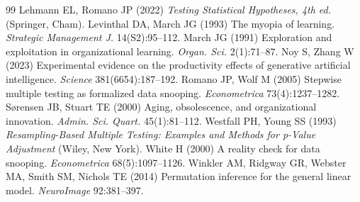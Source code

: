 \begin{thebibliography}{99}
 Lehmann EL, Romano JP (2022) \textit{Testing Statistical Hypotheses, 4th ed.} (Springer, Cham).
 Levinthal DA, March JG (1993) The myopia of learning. \textit{Strategic Management J.} 14(S2):95--112.
 March JG (1991) Exploration and exploitation in organizational learning. \textit{Organ. Sci.} 2(1):71--87.
 Noy S, Zhang W (2023) Experimental evidence on the productivity effects of generative artificial intelligence. \textit{Science} 381(6654):187--192.
 Romano JP, Wolf M (2005) Stepwise multiple testing as formalized data snooping. \textit{Econometrica} 73(4):1237--1282.
 S{\o}rensen JB, Stuart TE (2000) Aging, obsolescence, and organizational innovation. \textit{Admin. Sci. Quart.} 45(1):81--112.
 Westfall PH, Young SS (1993) \textit{Resampling-Based Multiple Testing: Examples and Methods for p-Value Adjustment} (Wiley, New York).
 White H (2000) A reality check for data snooping. \textit{Econometrica} 68(5):1097--1126.
 Winkler AM, Ridgway GR, Webster MA, Smith SM, Nichols TE (2014) Permutation inference for the general linear model. \textit{NeuroImage} 92:381--397.
\end{thebibliography}
